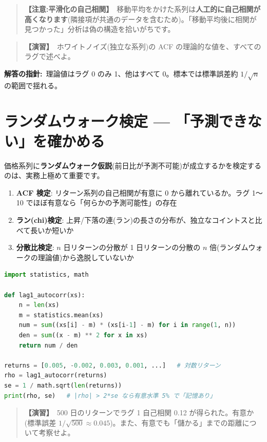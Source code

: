 \documentclass{article}
\begin{document}
\begin{quote}
\textbf{【注意:平滑化の自己相関】}\ 移動平均をかけた系列は\textbf{人工的に自己相関が高くなります}(隣接項が共通のデータを含むため)。「移動平均後に相関が見つかった」分析は偽の構造を拾いがちです。
\end{quote}

\begin{quote}
\textbf{【演習】}\ ホワイトノイズ(独立な系列)の ACF の理論的な値を、すべてのラグで述べよ。
\end{quote}

\textbf{解答の指針:}\ 理論値はラグ 0 のみ 1、他はすべて 0。標本では標準誤差約 \(1/\sqrt{n}\) の範囲で揺れる。

\section{ランダムウォーク検定 — 「予測できない」を確かめる}

価格系列に\textbf{ランダムウォーク仮説}(前日比が予測不可能)が成立するかを検定するのは、実務上極めて重要です。

\begin{enumerate}
\item \textbf{ACF 検定}: リターン系列の自己相関が有意に 0 から離れているか。ラグ 1〜10 でほぼ有意なら「何らかの予測可能性」の存在
\item \textbf{ラン(chi)検定}: 上昇/下落の連(ラン)の長さの分布が、独立なコイントスと比べて長いか短いか
\item \textbf{分散比検定}: \(n\) 日リターンの分散が 1 日リターンの分散の \(n\) 倍(ランダムウォークの理論値)から逸脱していないか
\end{enumerate}

\begin{lstlisting}[language=Python]
import statistics, math

def lag1_autocorr(xs):
    n = len(xs)
    m = statistics.mean(xs)
    num = sum((xs[i] - m) * (xs[i-1] - m) for i in range(1, n))
    den = sum((x - m) ** 2 for x in xs)
    return num / den

returns = [0.005, -0.002, 0.003, 0.001, ...]   # 対数リターン
rho = lag1_autocorr(returns)
se = 1 / math.sqrt(len(returns))
print(rho, se)   # |rho| > 2*se なら有意水準 5% で「記憶あり」
\end{lstlisting}

\begin{quote}
\textbf{【演習】}\ 500 日のリターンでラグ 1 自己相関 0.12 が得られた。有意か(標準誤差 \(1/\sqrt{500} \approx 0.045\))。また、有意でも「儲かる」までの距離について考察せよ。
\end{quote}
\end{document}
